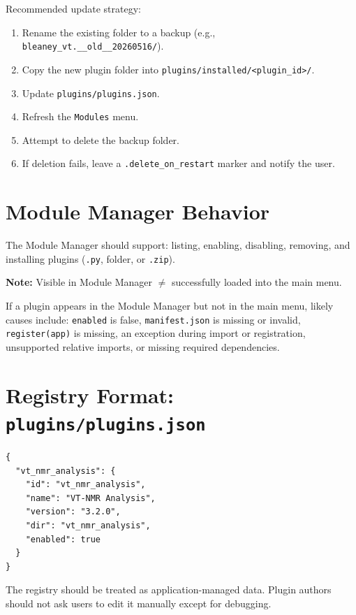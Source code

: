 \documentclass[11pt, a4paper]{article}
\begin{document}
Recommended update strategy:

\begin{enumerate}
  \item Rename the existing folder to a backup (e.g., \texttt{bleaney\_vt.\_\_old\_\_20260516/}).
  \item Copy the new plugin folder into \texttt{plugins/installed/<plugin\_id>/}.
  \item Update \texttt{plugins/plugins.json}.
  \item Refresh the \texttt{Modules} menu.
  \item Attempt to delete the backup folder.
  \item If deletion fails, leave a \texttt{.delete\_on\_restart} marker and notify the user.
\end{enumerate}

\section{Module Manager Behavior}

The Module Manager should support: listing, enabling, disabling, removing, and installing plugins (\texttt{.py}, folder, or \texttt{.zip}).

\begin{notebox}
\textbf{Note:} Visible in Module Manager $\neq$ successfully loaded into the main menu.
\end{notebox}

If a plugin appears in the Module Manager but not in the main menu, likely causes include: \texttt{enabled} is false, \texttt{manifest.json} is missing or invalid, \texttt{register(app)} is missing, an exception during import or registration, unsupported relative imports, or missing required dependencies.

\section{Registry Format: \texttt{plugins/plugins.json}}

\begin{lstlisting}[style=json]
{
  "vt_nmr_analysis": {
    "id": "vt_nmr_analysis",
    "name": "VT-NMR Analysis",
    "version": "3.2.0",
    "dir": "vt_nmr_analysis",
    "enabled": true
  }
}
\end{lstlisting}

The registry should be treated as application-managed data. Plugin authors should not ask users to edit it manually except for debugging.
\end{document}

